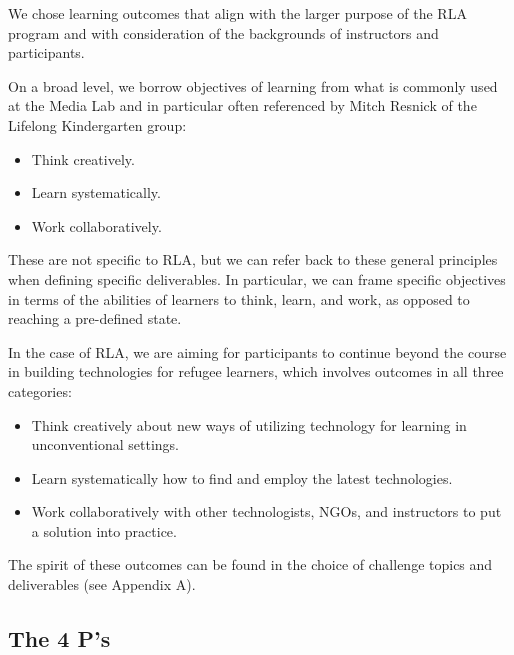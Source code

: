 \documentclass[12pt,twoside,vi]{mitthesis}
\begin{document}
We chose learning outcomes that align with the larger purpose of the RLA program and with consideration of the backgrounds of instructors and participants. 

On a broad level, we borrow objectives of learning from what is commonly used at the Media Lab and in particular often referenced by Mitch Resnick of the Lifelong Kindergarten group:
\begin{itemize}
\item Think creatively.
\item Learn systematically.
\item Work collaboratively.
\end{itemize}
These are not specific to RLA, but we can refer back to these general principles when defining specific deliverables. In particular, we can frame specific objectives in terms of the abilities of learners to think, learn, and work, as opposed to reaching a pre-defined state.~\cite{roleofmaking}

In the case of RLA, we are aiming for participants to continue beyond the course in building technologies for refugee learners, which involves outcomes in all three categories:
\begin{itemize}
	\item Think creatively about new ways of utilizing technology for learning in unconventional settings.
	\item Learn systematically how to find and employ the latest technologies.
	\item Work collaboratively with other technologists, NGOs, and instructors to put a solution into practice.
\end{itemize}
The spirit of these outcomes can be found in the choice of challenge topics and deliverables (see Appendix A).

\subsection{The 4 P's}
\end{document}
